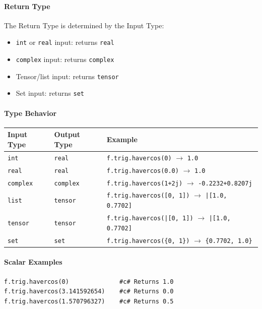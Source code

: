 \paragraph{Return Type}
The Return Type is determined by the Input Type:
\begin{itemize}
\item \texttt{int} or \texttt{real} input: returns \texttt{real}
\item \texttt{complex} input: returns \texttt{complex}
\item Tensor/list input: returns \texttt{tensor}
\item Set input: returns \texttt{set}
\end{itemize}

\paragraph{Type Behavior}
\begin{center}
\begin{tabular}{lll}
\textbf{Input Type} & \textbf{Output Type} & \textbf{Example} \\ \hline
\texttt{int} & \texttt{real} & \texttt{f.trig.havercos(0)} $\to$ \texttt{1.0} \\
\texttt{real} & \texttt{real} & \texttt{f.trig.havercos(0.0)} $\to$ \texttt{1.0} \\
\texttt{complex} & \texttt{complex} & \texttt{f.trig.havercos(1+2j)} $\to$ \texttt{-0.2232+0.8207j} \\
\texttt{list} & \texttt{tensor} & \texttt{f.trig.havercos([0, 1])} $\to$ \texttt{|[1.0, 0.7702]} \\
\texttt{tensor} & \texttt{tensor} & \texttt{f.trig.havercos(|[0, 1])} $\to$ \texttt{|[1.0, 0.7702]} \\
\texttt{set} & \texttt{set} & \texttt{f.trig.havercos(\{0, 1\})} $\to$ \texttt{\{0.7702, 1.0\}} \\
\end{tabular}
\end{center}

\paragraph{Scalar Examples}
\begin{verbatim}
f.trig.havercos(0)              #c# Returns 1.0
f.trig.havercos(3.141592654)    #c# Returns 0.0
f.trig.havercos(1.570796327)    #c# Returns 0.5
\end{verbatim}


